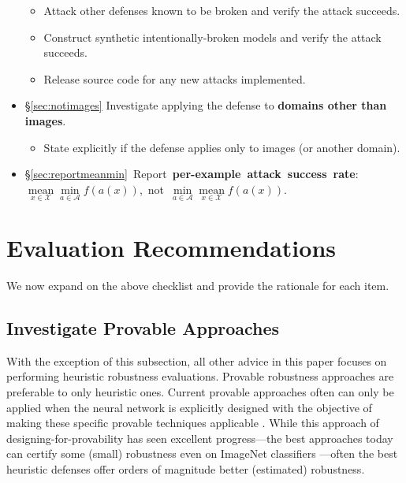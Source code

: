 \documentclass{article} %
\begin{document}
\begin{itemize}[leftmargin=*]
\begin{itemize}[leftmargin=*]
  \item Attack other defenses known to be broken and verify the attack succeeds.
  \item Construct synthetic intentionally-broken models and verify the attack succeeds.
  \item Release source code for any new attacks implemented.
  \end{itemize}
\item \S\ref{sec:notimages} Investigate applying the defense to \textbf{domains other than images}.
  \begin{itemize}[leftmargin=*]
  \item State explicitly if the defense applies only to images (or another domain).
  \end{itemize}
  \item \mbox{\S\ref{sec:reportmeanmin} Report \textbf{per-example attack success rate}:
$\mathop{\text{mean}}\limits_{x \in \mathcal{X}} \min\limits_{a \in \mathcal{A}} f(a(x))$, not
$\mathop{\text{min}}\limits_{a \in \mathcal{A}} \mathop{\text{mean}}\limits_{x \in \mathcal{X}} f(a(x))$.}
\end{itemize}

\section{Evaluation Recommendations}

We now expand on the above checklist and provide the rationale for each item.


\subsection{Investigate Provable Approaches}
\label{sec:provable}

With the exception of this subsection, all other advice in this
paper focuses on performing heuristic robustness evaluations.
%
Provable robustness approaches are preferable to only heuristic
ones.
%
Current provable approaches often can only be applied when the neural
network is explicitly designed with the objective of making these specific
provable techniques applicable \citep{kolter2017provable,raghunathan2018certified,WengZCSHBDD18}.
%
While this approach of designing-for-provability has seen excellent
progress---the best approaches today can certify some (small) robustness
even on ImageNet classifiers \citep{lecuyer2018certified}---often the best
heuristic defenses offer orders of magnitude better (estimated) robustness.
\end{document}
